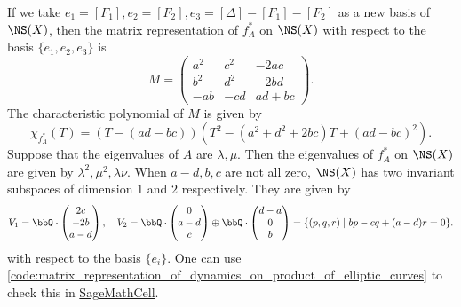     If we take \(e_1= [F_1],e_2=[F_2],e_3=[\Delta]-[F_1]-[F_2]\) as a new basis of \(\NS(X)\), then the matrix representation of \(f_A^*\) on \(\NS(X)\) with respect to the basis \(\{e_1,e_2,e_3\}\) is
    \[
        M = \begin{pmatrix}
            a^2 & c^2 & -2ac \\
            b^2 & d^2 & -2bd \\
            -ab & -cd & ad+bc
        \end{pmatrix}.
    \]
    The characteristic polynomial of \(M\) is given by
    \[ \chi_{f_A^*}(T) = (T - (ad-bc))(T^2 - (a^2+d^2+2bc)T + (ad-bc)^2). \]
    Suppose that the eigenvalues of \(A\) are \(\lambda, \mu\).
    Then the eigenvalues of \(f_A^*\) on \(\NS(X)\) are given by \(\lambda^2, \mu^2, \lambda \nu\).
    When \(a-d,b,c\) are not all zero, \(\NS(X)\) has two invariant subspaces of dimension \(1\) and \(2\) respectively.
    They are given by
    \[ V_1 = \bbQ \cdot \begin{pmatrix}
        2c \\
        -2b \\
        a-d
    \end{pmatrix}, \quad V_2 = \bbQ \cdot \begin{pmatrix}
        0 \\
        a-d \\
        c
    \end{pmatrix} \oplus \bbQ \cdot \begin{pmatrix}
        d-a \\
        0 \\
        b
    \end{pmatrix} = \{(p,q,r) \mid bp-cq+(a-d)r=0\}. \]
    with respect to the basis \(\{e_i\}\).
    One can use \cref{code:matrix_representation_of_dynamics_on_product_of_elliptic_curves} to check this in \href{https://sagecell.sagemath.org/}{SageMathCell}.

